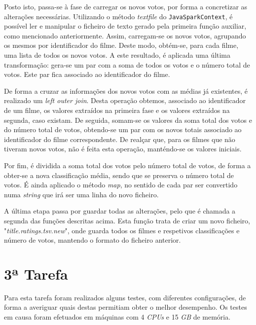 \documentclass[a4paper]{report}
\begin{document}
            Posto isto, passa-se à fase de carregar os novos votos, por forma a concretizar as alterações necessárias.
            Utilizando o método \textit{textfile} do \texttt{JavaSparkContext}, é possível ler e manipular o ficheiro de texto gerado pela primeira função auxiliar, como mencionado anteriormente.
            Assim, carregam-se os novos votos, agrupando os mesmos por identificador do filme. Deste modo, obtém-se, para cada filme, uma lista de todos os novos votos.
            A este resultado, é aplicada uma última transformação: gera-se um par com a soma de todos os votos e o número total de votos. Este par fica associado ao identificador do filme.

            De forma a cruzar as informações dos novos votos com as médias já existentes, é realizado um \textit{left outer join}.
            Desta operação obtemos, associado ao identificador de um filme, os valores extraídos na primeira fase e os valores extraídos na segunda, caso existam.
            De seguida, somam-se os valores da soma total dos votos e do número total de votos, obtendo-se um par com os novos totais associado ao identificador do filme correspondente.
            De realçar que, para os filmes que não tiveram novos votos, não é feita esta operação, manténdo-se os valores iniciais.

            Por fim, é dividida a soma total dos votos pelo número total de votos, de forma a obter-se a nova classificação média, sendo que se preserva o número total de votos.
            É ainda aplicado o método \textit{map}, no sentido de cada par ser convertido numa \textit{string} que irá ser uma linha do novo ficheiro.

            A última etapa passa por guardar todas as alterações, pelo que é chamada a segunda das funções descritas acima.
            Esta função trata de criar um novo ficheiro, "\textsl{title.ratings.tsv.new}", onde guarda todos os filmes e respetivos classificações e número de votos, mantendo o formato do ficheiro anterior.


    \section{3ª Tarefa} \label{sec:Task3}
    Para esta tarefa foram realizados alguns testes, com diferentes configurações, de forma a averiguar quais destas permitiam obter o melhor desempenho.
    Os testes em causa foram efetuados em máquinas com 4 \textit{CPUs} e 15 \textit{GB} de memória.
\end{document}
